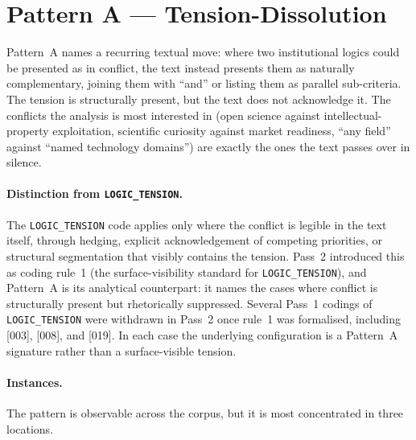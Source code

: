 \section{Pattern A --- Tension-Dissolution}
\label{sec:res-pattern-a}

Pattern~A names a recurring textual move: where two institutional
logics could be presented as in conflict, the text instead presents
them as naturally complementary, joining them with \enquote{and} or
listing them as parallel sub-criteria. The tension is structurally
present, but the text does not acknowledge it. The conflicts the
analysis is most interested in (open science against
intellectual-property exploitation, scientific curiosity against
market readiness, \enquote{any field} against \enquote{named
technology domains}) are exactly the ones the text passes over in
silence.

\paragraph{Distinction from \texttt{LOGIC\_TENSION}.}
The \texttt{LOGIC\_TENSION} code applies only where the conflict is
legible in the text itself, through hedging, explicit acknowledgement
of competing priorities, or structural segmentation that visibly
contains the tension. Pass~2 introduced this as coding rule~1 (the
surface-visibility standard for \texttt{LOGIC\_TENSION}), and
Pattern~A is its analytical counterpart: it names the cases where
conflict is structurally present but rhetorically suppressed. Several
Pass~1 codings of \texttt{LOGIC\_TENSION} were withdrawn in Pass~2
once rule~1 was formalised, including [003], [008], and [019]. In
each case the underlying configuration is a Pattern~A signature
rather than a surface-visible tension.

\paragraph{Instances.}
The pattern is observable across the corpus, but it is most
concentrated in three locations.


